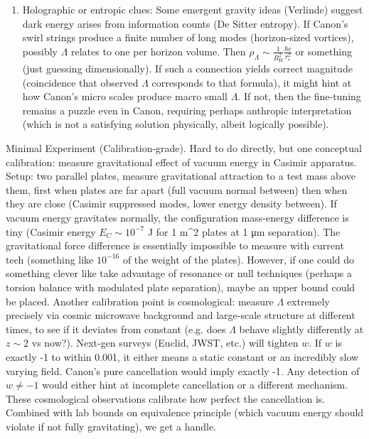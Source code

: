 \documentclass[11pt]{article}
\begin{document}
\begin{enumerate}
\item 
Holographic or entropic clues: Some emergent gravity ideas (Verlinde) suggest dark energy arises from information counts (De Sitter entropy). If Canon’s swirl strings produce a finite number of long modes (horizon-sized vortices), possibly $\Lambda$ relates to one per horizon volume. Then $\rho_{\Lambda} \sim \frac{1}{R_{\text{H}}^2} \frac{\hbar c}{r_c^2}$ or something (just guessing dimensionally). If such a connection yields correct magnitude (coincidence that observed $\Lambda$ corresponds to that formula), it might hint at how Canon’s micro scales produce macro small $\Lambda$. If not, then the fine-tuning remains a puzzle even in Canon, requiring perhaps anthropic interpretation (which is not a satisfying solution physically, albeit logically possible).




\end{enumerate}

Minimal Experiment (Calibration-grade). Hard to do directly, but one conceptual calibration: measure gravitational effect of vacuum energy in Casimir apparatus. Setup: two parallel plates, measure gravitational attraction to a test mass above them, first when plates are far apart (full vacuum normal between) then when they are close (Casimir suppressed modes, lower energy density between). If vacuum energy gravitates normally, the configuration mass-energy difference is tiny (Casimir energy $E_C \sim 10^{-7}$ J for 1 m^2 plates at 1 μm separation). The gravitational force difference is essentially impossible to measure with current tech (something like $10^{-16}$ of the weight of the plates). However, if one could do something clever like take advantage of resonance or null techniques (perhaps a torsion balance with modulated plate separation), maybe an upper bound could be placed. Another calibration point is cosmological: measure $\Lambda$ extremely precisely via cosmic microwave background and large-scale structure at different times, to see if it deviates from constant (e.g. does $\Lambda$ behave slightly differently at $z\sim2$ vs now?). Next-gen surveys (Euclid, JWST, etc.) will tighten $w$. If $w$ is exactly -1 to within 0.001, it either means a static constant or an incredibly slow varying field. Canon’s pure cancellation would imply exactly -1. Any detection of $w \neq -1$ would either hint at incomplete cancellation or a different mechanism. These cosmological observations calibrate how perfect the cancellation is. Combined with lab bounds on equivalence principle (which vacuum energy should violate if not fully gravitating), we get a handle.
\end{document}
